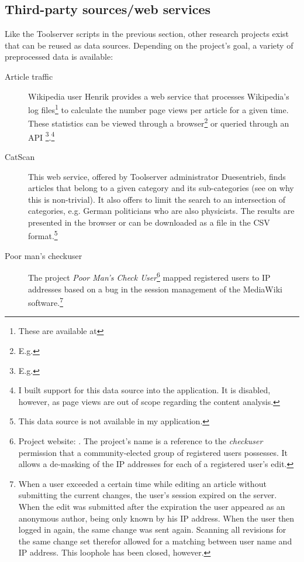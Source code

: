 \subsection{Third-party sources/web services}\label{sub:webservices}

Like the Toolserver scripts in the previous section, other research projects exist that can be reused as data sources.
Depending on the project's goal, a variety of preprocessed data is available:

\begin{description}
\item[Article traffic] Wikipedia user Henrik provides a web service that processes Wikipedia's log files\footnote{These are available at } to calculate the number page views per article for a given time.
These statistics can be viewed through a browser\footnote{E.g. } or queried through an \ac{API} \footnote{E.g. }.\footnote{I built support for this data source into the application. It is disabled, however, as page views are out of scope regarding the content analysis.}
\item[CatScan] This web service, offered by Toolserver administrator Duesentrieb, finds articles that belong to a given category and its sub-categories (see  on why this is non-trivial).
It also offers to limit the search to an intersection of categories, e.g. German politicians who are also physicists.
The results are presented in the browser or can be downloaded as a file in the \ac{CSV} format.\footnote{This data source is not available in my application.}
\item[Poor man's checkuser] The project \emph{Poor Man's Check User}\footnote{Project website: . The project's name is a reference to the \emph{checkuser} permission that a community-elected group of registered users possesses. It allows a de-masking of the \ac{IP} addresses for each of a registered user's edit.} mapped registered users to \ac{IP} addresses based on a bug in the session management of the MediaWiki software.\footnote{When a user exceeded a certain time while editing an article without submitting the current changes, the user's session expired on the server. When the edit was submitted after the expiration the user appeared as an anonymous author, being only known by his \ac{IP} address. When the user then logged in again, the same change was sent again. Scanning all revisions for the same change set therefor allowed for a matching between user name and \ac{IP} address. This loophole has been closed, however.} 

\end{description}
